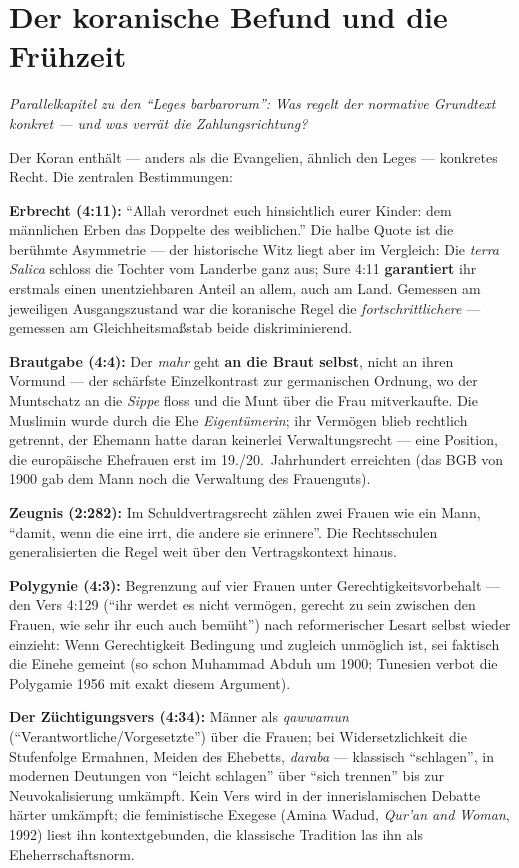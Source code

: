 \documentclass[11pt,a4paper,ngerman]{scrartcl}
\newcommand{\chipbase}[2]{\hspace{0pt}{\footnotesize\textcolor{#1}{[\textsc{#2}]}}}
\newcommand{\chipbelegt}[1]{\chipbase{chipgreen}{#1}}
\newcommand{\chipumstritten}[1]{\chipbase{chipred}{#1}}
\begin{document}
\section{Der koranische Befund und die Frühzeit}
\noindent\textit{Parallelkapitel zu den \enquote{Leges barbarorum}: Was regelt der normative Grundtext konkret --- und was verrät die Zahlungsrichtung?}
\medskip

Der Koran enthält --- anders als die Evangelien, ähnlich den Leges --- konkretes Recht. Die zentralen Bestimmungen:

\textbf{Erbrecht (4:11):} \enquote{Allah verordnet euch hinsichtlich eurer Kinder: dem männlichen Erben das Doppelte des weiblichen.} Die halbe Quote ist die berühmte Asymmetrie --- der historische Witz liegt aber im Vergleich: Die \emph{terra Salica} schloss die Tochter vom Landerbe ganz aus; Sure 4:11 \textbf{garantiert} ihr erstmals einen unentziehbaren Anteil an allem, auch am Land. Gemessen am jeweiligen Ausgangszustand war die koranische Regel die \emph{fortschrittlichere} --- gemessen am Gleichheitsmaßstab beide diskriminierend. \chipbelegt{belegt}

\textbf{Brautgabe (4:4):} Der \emph{mahr} geht \textbf{an die Braut selbst}, nicht an ihren Vormund --- der schärfste Einzelkontrast zur germanischen Ordnung, wo der Muntschatz an die \emph{Sippe} floss und die Munt über die Frau mitverkaufte. Die Muslimin wurde durch die Ehe \emph{Eigentümerin}; ihr Vermögen blieb rechtlich getrennt, der Ehemann hatte daran keinerlei Verwaltungsrecht --- eine Position, die europäische Ehefrauen erst im 19./20.~Jahrhundert erreichten (das BGB von 1900 gab dem Mann noch die Verwaltung des Frauenguts). \chipbelegt{belegt}

\textbf{Zeugnis (2:282):} Im Schuldvertragsrecht zählen zwei Frauen wie ein Mann, \enquote{damit, wenn die eine irrt, die andere sie erinnere}. Die Rechtsschulen generalisierten die Regel weit über den Vertragskontext hinaus. \chipbelegt{belegt}

\textbf{Polygynie (4:3):} Begrenzung auf vier Frauen unter Gerechtigkeitsvorbehalt --- den Vers 4:129 (\enquote{ihr werdet es nicht vermögen, gerecht zu sein zwischen den Frauen, wie sehr ihr euch auch bemüht}) nach reformerischer Lesart selbst wieder einzieht: Wenn Gerechtigkeit Bedingung und zugleich unmöglich ist, sei faktisch die Einehe gemeint (so schon Muhammad Abduh um 1900; Tunesien verbot die Polygamie 1956 mit exakt diesem Argument). \chipumstritten{umstritten}

\textbf{Der Züchtigungsvers (4:34):} Männer als \emph{qawwamun} (\enquote{Verantwortliche/Vorgesetzte}) über die Frauen; bei Widersetzlichkeit die Stufenfolge Ermahnen, Meiden des Ehebetts, \emph{daraba} --- klassisch \enquote{schlagen}, in modernen Deutungen von \enquote{leicht schlagen} über \enquote{sich trennen} bis zur Neuvokalisierung umkämpft. Kein Vers wird in der innerislamischen Debatte härter umkämpft; die feministische Exegese (Amina Wadud, \emph{Qur'an and Woman}, 1992) liest ihn kontextgebunden, die klassische Tradition las ihn als Eheherrschaftsnorm. \chipumstritten{umstritten}
\end{document}
